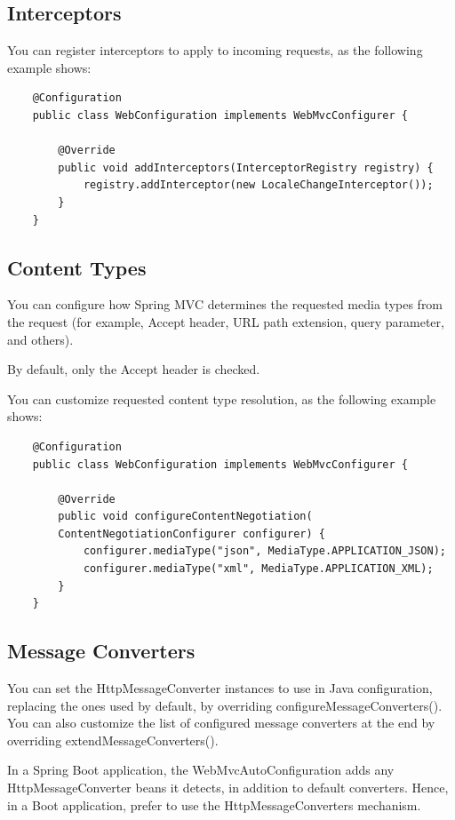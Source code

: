 \documentclass{scrartcl}
\begin{document}
\subsection{Interceptors}

You can register interceptors to apply to incoming requests, as the following example shows:

\begin{lstlisting}
    @Configuration
    public class WebConfiguration implements WebMvcConfigurer {

        @Override
        public void addInterceptors(InterceptorRegistry registry) {
            registry.addInterceptor(new LocaleChangeInterceptor());
        }
    }
\end{lstlisting}

\subsection{Content Types}

You can configure how Spring MVC determines the requested media types from the request (for example, Accept header, URL path extension, query parameter, and others).

By default, only the Accept header is checked.

You can customize requested content type resolution, as the following example shows:

\begin{lstlisting}
    @Configuration
    public class WebConfiguration implements WebMvcConfigurer {

        @Override
        public void configureContentNegotiation(
        ContentNegotiationConfigurer configurer) {
            configurer.mediaType("json", MediaType.APPLICATION_JSON);
            configurer.mediaType("xml", MediaType.APPLICATION_XML);
        }
    }
\end{lstlisting}

\subsection{Message Converters}

You can set the HttpMessageConverter instances to use in Java configuration, replacing the ones used by default, by overriding configureMessageConverters(). You can also customize the list of configured message converters at the end by overriding extendMessageConverters().

In a Spring Boot application, the WebMvcAutoConfiguration adds any HttpMessageConverter beans it detects, in addition to default converters. Hence, in a Boot application, prefer to use the HttpMessageConverters mechanism.
\end{document}
